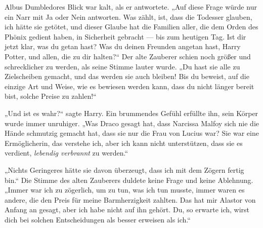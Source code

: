 Albus Dumbledores Blick war kalt, als er antwortete.
„Auf diese Frage würde nur ein Narr mit Ja oder Nein antworten. Was zählt, ist, dass die Todesser glauben, ich hätte sie getötet, und dieser Glaube hat die Familien aller, die dem Orden des Phönix gedient haben, in Sicherheit gebracht — bis zum heutigen Tag. Ist dir jetzt klar, was du getan hast? Was du deinen Freunden angetan hast, Harry Potter, und allen, die zu dir halten?“
Der alte Zauberer schien noch größer und schrecklicher zu werden, als seine Stimme lauter wurde.
„Du hast sie alle zu Zielscheiben gemacht, und das werden sie auch bleiben! Bis du beweist, auf die einzige Art und Weise, wie es bewiesen werden kann, dass du nicht länger bereit bist, solche Preise zu zahlen!“

„Und ist es wahr?“ sagte Harry.
Ein brummendes Gefühl erfüllte ihn, sein Körper wurde immer unruhiger.
„Was Draco gesagt hat, dass Narcissa Malfoy sich nie die Hände schmutzig gemacht hat, dass sie nur die Frau von Lucius war? Sie war eine Ermöglicherin, das verstehe ich, aber ich kann nicht unterstützen, dass sie es verdient, \emph{lebendig verbrannt} zu werden.“

„Nichts Geringeres hätte sie davon überzeugt, dass ich mit dem Zögern fertig bin.“ Die Stimme des alten Zauberers duldete keine Frage und keine Ablehnung.
„Immer war ich zu zögerlich, um zu tun, was ich tun musste, immer waren es andere, die den Preis für meine Barmherzigkeit zahlten. Das hat mir Alastor von Anfang an gesagt, aber ich habe nicht auf ihn gehört. Du, so erwarte ich, wirst dich bei solchen Entscheidungen als besser erweisen als ich.“

